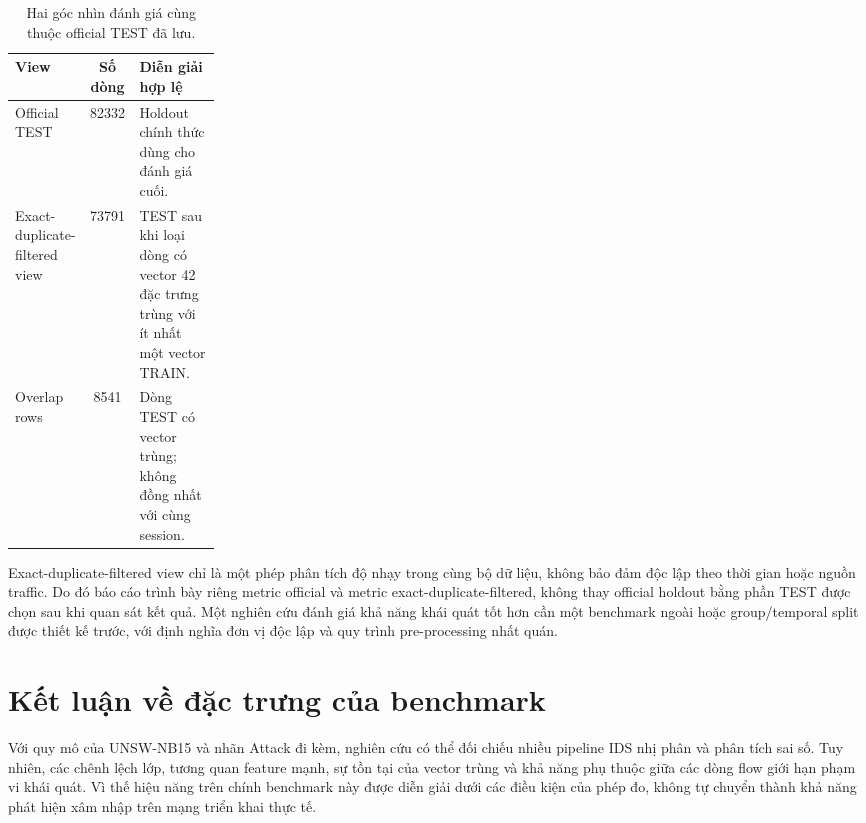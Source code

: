 \begin{table}[htbp]
\centering\small
\renewcommand{\arraystretch}{1.3}
\setlength{\tabcolsep}{8pt}
\caption{Hai góc nhìn đánh giá cùng thuộc official TEST đã lưu.}
\label{tab:views-test}
\begin{tabularx}{\linewidth}{p{0.24\linewidth} S[table-format=5.0] X}\toprule
View & {Số dòng} & Diễn giải hợp lệ\\\midrule
Official TEST & 82332 & Holdout chính thức dùng cho đánh giá cuối.\\
Exact-duplicate-filtered view & 73791 & TEST sau khi loại dòng có vector 42 đặc trưng trùng với ít nhất một vector TRAIN.\\
Overlap rows & 8541 & Dòng TEST có vector trùng; không đồng nhất với cùng session.\\\bottomrule
\end{tabularx}
\end{table}

Exact-duplicate-filtered view chỉ là một phép phân tích độ nhạy trong cùng bộ dữ liệu, không bảo đảm độc lập theo thời gian hoặc nguồn traffic. Do đó báo cáo trình bày riêng metric official và metric exact-duplicate-filtered, không thay official holdout bằng phần TEST được chọn sau khi quan sát kết quả. Một nghiên cứu đánh giá khả năng khái quát tốt hơn cần một benchmark ngoài hoặc group/temporal split được thiết kế trước, với định nghĩa đơn vị độc lập và quy trình pre-processing nhất quán.

\section{Kết luận về đặc trưng của benchmark}
Với quy mô của UNSW-NB15 và nhãn Attack đi kèm, nghiên cứu có thể đối chiếu nhiều pipeline IDS nhị phân và phân tích sai số. Tuy nhiên, các chênh lệch lớp, tương quan feature mạnh, sự tồn tại của vector trùng và khả năng phụ thuộc giữa các dòng flow giới hạn phạm vi khái quát. Vì thế hiệu năng trên chính benchmark này được diễn giải dưới các điều kiện của phép đo, không tự chuyển thành khả năng phát hiện xâm nhập trên mạng triển khai thực tế.
